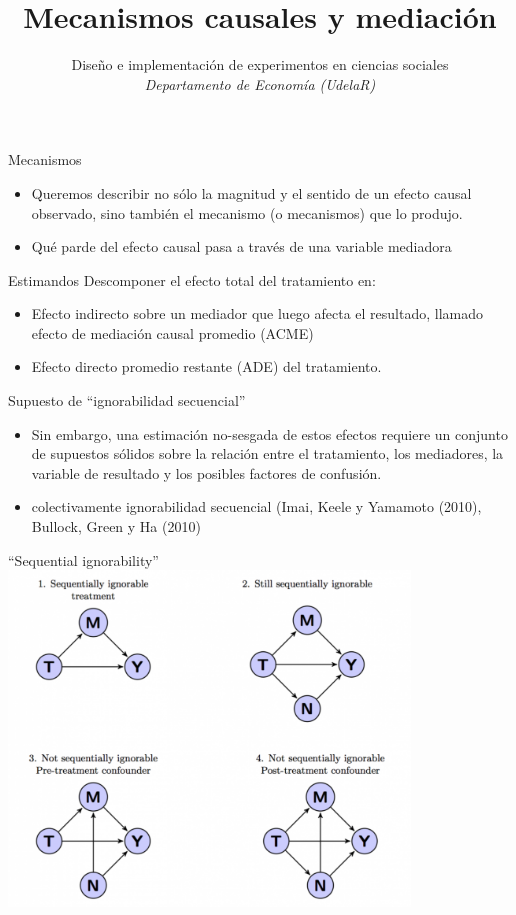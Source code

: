 \documentclass[
  ignorenonframetext,
]{beamer}
\title{Mecanismos causales y mediación}
\author{Diseño e implementación de experimentos en ciencias sociales\\
\emph{Departamento de Economía (UdelaR)}}
\date{}
\begin{document}
\frame{\titlepage}

\begin{frame}{Mecanismos}
\protect\hypertarget{mecanismos}{}
\begin{itemize}
\item
  Queremos describir no sólo la magnitud y el sentido de un efecto
  causal observado, sino también el mecanismo (o mecanismos) que lo
  produjo.
\item
  Qué parde del efecto causal pasa a través de una variable mediadora
\end{itemize}
\end{frame}

\begin{frame}{Estimandos}
\protect\hypertarget{estimandos}{}
Descomponer el efecto total del tratamiento en:

\begin{itemize}
\item
  Efecto indirecto sobre un mediador que luego afecta el resultado,
  llamado efecto de mediación causal promedio (ACME)
\item
  Efecto directo promedio restante (ADE) del tratamiento.
\end{itemize}
\end{frame}

\begin{frame}{Supuesto de ``ignorabilidad secuencial''}
\protect\hypertarget{supuesto-de-ignorabilidad-secuencial}{}
\begin{itemize}
\item
  Sin embargo, una estimación no-sesgada de estos efectos requiere un
  conjunto de supuestos sólidos sobre la relación entre el tratamiento,
  los mediadores, la variable de resultado y los posibles factores de
  confusión.
\item
  colectivamente ignorabilidad secuencial (Imai, Keele y Yamamoto
  (2010), Bullock, Green y Ha (2010)
\end{itemize}
\end{frame}

\begin{frame}{``Sequential ignorability''}
\protect\hypertarget{sequential-ignorability}{}
\center \includegraphics[width=0.8\textwidth,height=\textheight]{figs/sequential_ignorability}
\end{frame}
\end{document}
